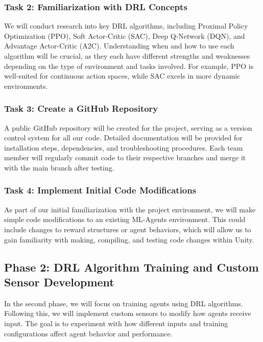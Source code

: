 \documentclass{article}
\begin{document}
\begin{flushleft}
\subsubsection{Task 2: Familiarization with DRL Concepts}
\hspace{2em}We will conduct research into key DRL algorithms, including Proximal Policy Optimization (PPO), Soft Actor-Critic (SAC), Deep Q-Network (DQN), and Advantage Actor-Critic (A2C). Understanding when and how to use each algorithm will be crucial, as they each have different strengths and weaknesses depending on the type of environment and tasks involved. For example, PPO is well-suited for continuous action spaces, while SAC excels in more dynamic environments.

\subsubsection{Task 3: Create a GitHub Repository}
\hspace{2em}A public GitHub repository will be created for the project, serving as a version control system for all our code. Detailed documentation will be provided for installation steps, dependencies, and troubleshooting procedures. Each team member will regularly commit code to their respective branches and merge it with the main branch after testing.

\subsubsection{Task 4: Implement Initial Code Modifications}
\hspace{2em}As part of our initial familiarization with the project environment, we will make simple code modifications to an existing ML-Agents environment. This could include changes to reward structures or agent behaviors, which will allow us to gain familiarity with making, compiling, and testing code changes within Unity.

\subsection{Phase 2: DRL Algorithm Training and Custom Sensor Development}

\hspace{2em}In the second phase, we will focus on training agents using DRL algorithms. Following this, we will implement custom sensors to modify how agents receive input. The goal is to experiment with how different inputs and training configurations affect agent behavior and performance.


\end{flushleft}
\end{document}
